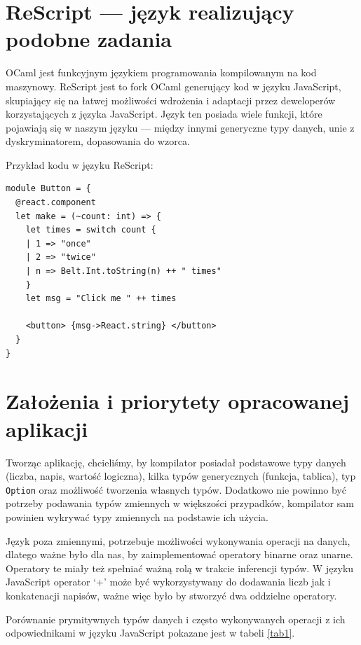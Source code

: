\documentclass[a4paper,12pt]{book} %
\begin{document}
\chapter{ReScript --- język realizujący podobne zadania}
OCaml jest funkcyjnym językiem programowania kompilowanym na kod maszynowy.
ReScript jest to fork OCaml generujący kod w języku JavaScript, skupiający się na łatwej możliwości wdrożenia i adaptacji przez deweloperów korzystających z języka JavaScript.
Język ten posiada wiele funkcji, które pojawiają się w naszym języku --- między innymi generyczne typy danych, unie z dyskryminatorem, dopasowania do wzorca.

Przykład kodu w języku ReScript:
\begin{lstlisting}
module Button = {
  @react.component
  let make = (~count: int) => {
    let times = switch count {
    | 1 => "once"
    | 2 => "twice"
    | n => Belt.Int.toString(n) ++ " times"
    }
    let msg = "Click me " ++ times

    <button> {msg->React.string} </button>
  }
}
\end{lstlisting}
\chapter{Założenia i priorytety opracowanej aplikacji}
Tworząc aplikację, chcieliśmy, by kompilator posiadał podstawowe typy danych (liczba, napis, wartość logiczna), kilka typów generycznych (funkcja, tablica), typ \lstinline$Option$ oraz możliwość tworzenia własnych typów.
Dodatkowo nie powinno być potrzeby podawania typów zmiennych w większości przypadków, kompilator sam powinien wykrywać typy zmiennych na podstawie ich użycia.


Język poza zmiennymi, potrzebuje możliwości wykonywania operacji na danych, dlatego ważne było dla nas, by zaimplementować operatory binarne oraz unarne. Operatory te miały też spełniać ważną rolą w trakcie inferencji typów. W języku JavaScript operator `+' może być wykorzystywany do dodawania liczb jak i konkatenacji napisów, ważne więc było by stworzyć dwa oddzielne operatory.



Porównanie prymitywnych typów danych i często wykonywanych operacji z ich odpowiednikami w języku JavaScript pokazane jest w tabeli \ref{tab1}.
\end{document}
